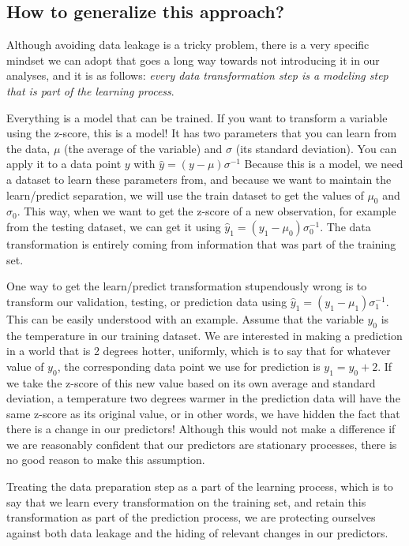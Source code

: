 \documentclass[
  letterpaper,
]{scrbook}
\begin{document}
\subsection{How to generalize this
approach?}\label{how-to-generalize-this-approach}

Although avoiding data leakage is a tricky problem, there is a very
specific mindset we can adopt that goes a long way towards not
introducing it in our analyses, and it is as follows: \emph{every data
transformation step is a modeling step that is part of the learning
process}.

Everything is a model that can be trained. If you want to transform a
variable using the z-score, this is a model! It has two parameters that
you can learn from the data, \(\mu\) (the average of the variable) and
\(\sigma\) (its standard deviation). You can apply it to a data point
\(y\) with \(\hat y = (y - \mu)\sigma^{-1}\) Because this is a model, we
need a dataset to learn these parameters from, and because we want to
maintain the learn/predict separation, we will use the train dataset to
get the values of \(\mu_0\) and \(\sigma_0\). This way, when we want to
get the z-score of a new observation, for example from the testing
dataset, we can get it using \(\hat y_1 = (y_1 - \mu_0)\sigma_0^{-1}\).
The data transformation is entirely coming from information that was
part of the training set.

One way to get the learn/predict transformation stupendously wrong is to
transform our validation, testing, or prediction data using
\(\hat y_1 = (y_1 - \mu_1)\sigma_1^{-1}\). This can be easily understood
with an example. Assume that the variable \(y_0\) is the temperature in
our training dataset. We are interested in making a prediction in a
world that is 2 degrees hotter, uniformly, which is to say that for
whatever value of \(y_0\), the corresponding data point we use for
prediction is \(y_1 = y_0 + 2\). If we take the z-score of this new
value based on its own average and standard deviation, a temperature two
degrees warmer in the prediction data will have the same z-score as its
original value, or in other words, we have hidden the fact that there is
a change in our predictors! Although this would not make a difference if
we are reasonably confident that our predictors are stationary
processes, there is no good reason to make this assumption.

Treating the data preparation step as a part of the learning process,
which is to say that we learn every transformation on the training set,
and retain this transformation as part of the prediction process, we are
protecting ourselves against both data leakage and the hiding of
relevant changes in our predictors.
\end{document}
